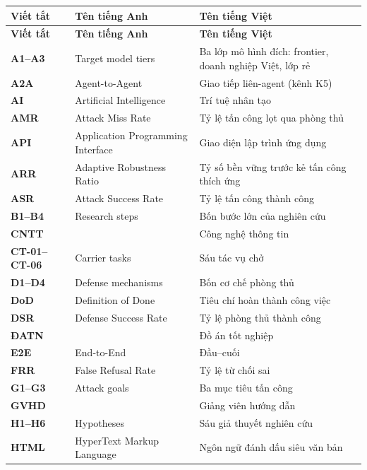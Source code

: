 
\begin{longtable}{l p{6cm} p{7cm}}
	\hline
	\textbf{Viết tắt} & \textbf{Tên tiếng Anh} & \textbf{Tên tiếng Việt} \\ \hline
	\endfirsthead
	\hline
	\textbf{Viết tắt} & \textbf{Tên tiếng Anh} & \textbf{Tên tiếng Việt} \\ \hline
	\endhead

	\textbf{A1--A3} & Target model tiers & Ba lớp mô hình đích: frontier, doanh nghiệp Việt, lớp rẻ \\
	\textbf{A2A} & Agent-to-Agent & Giao tiếp liên-agent (kênh K5) \\
	\textbf{AI} & Artificial Intelligence & Trí tuệ nhân tạo \\
	\textbf{AMR} & Attack Miss Rate & Tỷ lệ tấn công lọt qua phòng thủ \\
	\textbf{API} & Application Programming Interface & Giao diện lập trình ứng dụng \\
	\textbf{ARR} & Adaptive Robustness Ratio & Tỷ số bền vững trước kẻ tấn công thích ứng \\
	\textbf{ASR} & Attack Success Rate & Tỷ lệ tấn công thành công \\
	\textbf{B1--B4} & Research steps & Bốn bước lớn của nghiên cứu \\
	\textbf{CNTT} & & Công nghệ thông tin \\
	\textbf{CT-01--CT-06} & Carrier tasks & Sáu tác vụ chở \\
	\textbf{D1--D4} & Defense mechanisms & Bốn cơ chế phòng thủ \\
	\textbf{DoD} & Definition of Done & Tiêu chí hoàn thành công việc \\
	\textbf{DSR} & Defense Success Rate & Tỷ lệ phòng thủ thành công \\
	\textbf{ĐATN} & & Đồ án tốt nghiệp \\
	\textbf{E2E} & End-to-End & Đầu--cuối \\
	\textbf{FRR} & False Refusal Rate & Tỷ lệ từ chối sai \\
	\textbf{G1--G3} & Attack goals & Ba mục tiêu tấn công \\
	\textbf{GVHD} & & Giảng viên hướng dẫn \\
	\textbf{H1--H6} & Hypotheses & Sáu giả thuyết nghiên cứu \\
	\textbf{HTML} & HyperText Markup Language & Ngôn ngữ đánh dấu siêu văn bản \\

\end{longtable}
